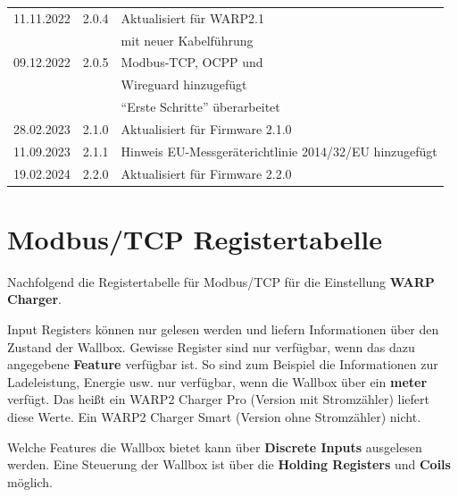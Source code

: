 \documentclass[a4paper,10pt]{article}
\begin{document}
\begin{multicols*}{2}
\begin{tabular}{lll}
        11.11.2022 & 2.0.4   & Aktualisiert für WARP2.1        \\
                   &         & mit neuer Kabelführung          \\
        09.12.2022 & 2.0.5   & Modbus-TCP, OCPP und            \\
                   &         & Wireguard hinzugefügt           \\
                   &         & \enquote{Erste Schritte} überarbeitet \\
        28.02.2023 & 2.1.0   & Aktualisiert für Firmware 2.1.0 \\
        11.09.2023 & 2.1.1   & Hinweis EU-Messgeräterichtlinie 2014/32/EU hinzugefügt\\
        19.02.2024 & 2.2.0   & Aktualisiert für Firmware 2.2.0 \\
        \bottomrule
    \end{tabular}

    \vfill
    \null

    \columnbreak
\appendix

\section{Modbus/TCP Registertabelle}
\label{modbus_tcp_registertabelle}
Nachfolgend die Registertabelle für Modbus/TCP für die Einstellung \textbf{WARP
Charger}.

Input Registers können nur gelesen werden und liefern Informationen über den
Zustand der Wallbox. Gewisse Register sind nur verfügbar, wenn das dazu
angegebene \textbf{Feature} verfügbar ist. So sind zum Beispiel die
Informationen zur Ladeleistung, Energie usw. nur verfügbar, wenn die Wallbox
über ein \textbf{meter} verfügt. Das heißt ein WARP2 Charger Pro (Version mit
Stromzähler) liefert diese Werte. Ein WARP2 Charger Smart (Version ohne
Stromzähler) nicht.

Welche Features die Wallbox bietet kann über \textbf{Discrete Inputs} ausgelesen
werden. Eine Steuerung der Wallbox ist über die \textbf{Holding Registers} und \textbf{Coils}
möglich.
\end{multicols*}
\end{document}
